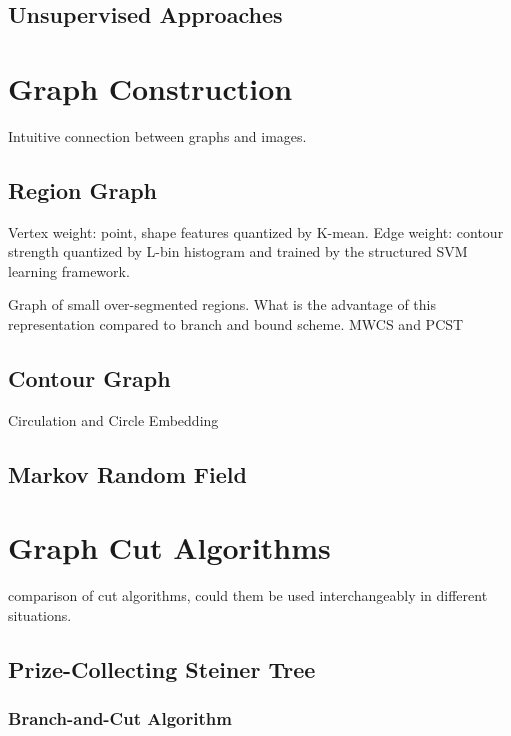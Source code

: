 \documentclass{SMBV12}
\begin{document}
\subsection{Unsupervised Approaches}



\section{Graph Construction}

Intuitive connection between graphs and images.

\subsection{Region Graph}

\cite{arbelaez2009contours}

Vertex weight: point, shape features quantized by K-mean.
Edge weight: contour strength quantized by L-bin histogram and trained by the structured SVM learning framework.

Graph of small over-segmented regions. What is the advantage of this representation compared to branch and bound scheme. MWCS and PCST

\subsection{Contour Graph}

Circulation and Circle Embedding

\subsection{Markov Random Field}

\section{Graph Cut Algorithms}

comparison of cut algorithms, could them be used interchangeably in different situations.

\subsection{Prize-Collecting Steiner Tree}

\cite{ljubic2006algorithmic}

\subsubsection{Branch-and-Cut Algorithm}
\end{document}
